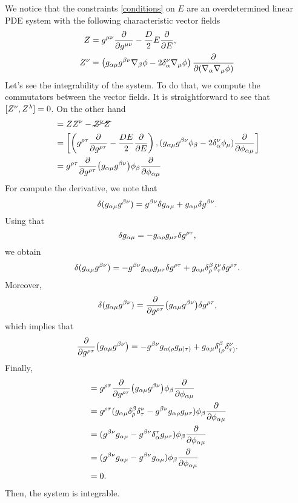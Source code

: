 We notice that the constraints \eqref{conditions} on $E$ are an overdetermined linear PDE system with the following characteristic vector fields
\begin{align}
	Z&=g^{\mu\nu }\pdv{g^{\mu\nu}}-\frac{D}{2}E\pdv{E},\\
	Z^\nu &=\left(g_{\alpha\mu }g^{\beta\nu }\nabla_\beta \phi -2\delta^\nu_\alpha \nabla_\mu \phi \right)\pdv{(\nabla_\alpha\nabla_\mu\phi)}
\end{align}
Let's see the integrability of the system. To do that, we compute the commutators between the vector fields. It is straightforward to see that $[Z^\nu, Z^\lambda ]=0$. On the other hand
\begin{align}
  [Z,Z^\n ]&=ZZ^\n -\cancel{Z^\n  Z}\\
  &=\left[\left(g^{\r\t }\pdv{g^{\r\t }}-\frac{DE}{2}\pdv{E}\right),(g_{\a\m }g^{\b\n }\f_\b -2\d^\n_\a \f_\m )\pdv{\f_{\a\m }}\right]\\
  &=g^{\r\t }\pdv{g^{\r\t }}(g_{\a\m }g^{\b\n })\f_\b\pdv{\f_{\a\m }}
\end{align}
For compute the derivative, we note that
\begin{equation}
  \delta (g_{\alpha\mu }g^{\beta\nu })=g^{\beta\nu }\delta g_{\alpha\mu }+g_{\alpha\mu }\delta g^{\beta\nu }.
\end{equation}
Using that
\begin{equation}
  \delta g_{\alpha\mu }=-g_{\alpha\rho }g_{\mu\tau }\delta g^{\rho\tau },
\end{equation}
we obtain
\begin{equation}
  \delta (g_{\alpha\mu }g^{\beta\nu })=-g^{\beta\nu }g_{\alpha\rho }g_{\mu\tau }\delta g^{\rho\tau }+g_{\alpha\mu }\delta^\beta_\rho \delta^\nu_\tau \delta g^{\rho\tau }.
\end{equation}
Moreover,
\begin{equation}
  \delta (g_{\alpha\mu }g^{\beta\nu })=\pdv{g^{\rho\tau}}(g_{\alpha\mu }g^{\beta\nu })\delta g^{\rho\tau },
\end{equation}
which implies that
\begin{equation}
  \pdv{g^{\rho\tau}}(g_{\alpha\mu }g^{\beta\nu })=-g^{\beta\nu }g_{\alpha(\rho }g_{\mu|\tau) }+g_{\alpha\mu }\delta^\beta_{(\rho} \delta^\nu_{\tau)}.
\end{equation}
Finally,
\begin{align}
  [Z,Z^\n ]&=g^{\r\t }\pdv{g^{\r\t }}(g_{\a\m }g^{\b\n })\f_\b\pdv{\f_{\a\m }}\\
  &=g^{\r\t }(g_{\a\m }\d^\b_\r \d^\n_\t -g^{\b\n }g_{\a\r }g_{\m\t })\f_\b \pdv{\f_{\a\m }}\\
  &=(g^{\b\n }g_{\a\m }-g^{\b\n }\d^\t_\a g_{\m\t })\f_\b \pdv{\f_{\a\m }}\\
  &=(g^{\b\n }g_{\a\m }-g^{\b\n }g_{\a\m })\f_\b \pdv{\f_{\a\m }}\\
  &=0.
\end{align}
Then, the system is integrable.

